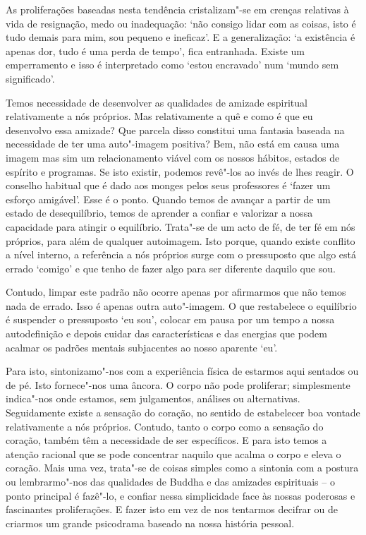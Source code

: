 As proliferações
baseadas nesta tendência cristalizam"-se em crenças relativas à vida de
resignação, medo ou inadequação: `não consigo lidar com as coisas, isto é tudo
demais para mim, sou pequeno e ineficaz'. E a generalização: `a existência é
apenas dor, tudo é uma perda de tempo', fica entranhada. Existe um emperramento
e isso é interpretado como `estou encravado' num `mundo sem significado'.

Temos necessidade de desenvolver as qualidades de amizade espiritual
relativamente a nós próprios. Mas relativamente a quê e como é que eu desenvolvo
essa amizade? Que parcela disso constitui uma fantasia baseada na necessidade de
ter uma auto"-imagem positiva? Bem, não está em causa uma imagem mas sim um
relacionamento viável com os nossos hábitos, estados de espírito e programas. Se
isto existir, podemos revê"-los ao invés de lhes reagir. O conselho habitual que
é dado aos monges pelos seus professores é `fazer um esforço amigável'. Esse é o
ponto. Quando temos de avançar a partir de um estado de desequilíbrio, temos de
aprender a confiar e valorizar a nossa capacidade para atingir o equilíbrio.
Trata"-se de um acto de fé, de ter fé em nós próprios, para além de qualquer
autoimagem. Isto porque, quando existe conflito a nível interno, a referência a
nós próprios surge com o pressuposto que algo está errado `comigo' e que tenho
de fazer algo para ser diferente daquilo que sou.

Contudo, limpar este padrão não ocorre apenas por afirmarmos que não temos nada
de errado. Isso é apenas outra auto"-imagem. O que restabelece o equilíbrio é
suspender o pressuposto `eu sou', colocar em pausa por um tempo a nossa
autodefinição e depois cuidar das características e das energias que podem
acalmar os padrões mentais subjacentes ao nosso aparente `eu'.

Para isto, sintonizamo"-nos com a experiência física de estarmos aqui sentados
ou de pé. Isto fornece"-nos uma âncora. O corpo não pode proliferar;
simplesmente indica"-nos onde estamos, sem julgamentos, análises ou
alternativas. Seguidamente existe a sensação do coração, no sentido de
estabelecer boa vontade relativamente a nós próprios. Contudo, tanto o corpo
como a sensação do coração, também têm a necessidade de ser específicos. E para
isto temos a atenção racional que se pode concentrar naquilo que acalma o corpo
e eleva o coração. Mais uma vez, trata"-se de coisas simples como a sintonia com
a postura ou lembrarmo"-nos das qualidades de Buddha e das amizades espirituais
-- o ponto principal é fazê"-lo, e confiar nessa simplicidade face às nossas
poderosas e fascinantes proliferações. E fazer isto em vez de nos tentarmos
decifrar ou de criarmos um grande psicodrama baseado na nossa história pessoal.

